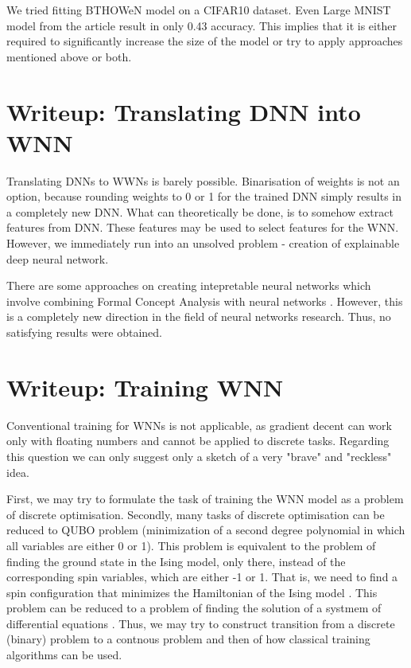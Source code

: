\documentclass{article}[12pt]
\begin{document}
We tried fitting BTHOWeN model on a CIFAR10 dataset. Even Large MNIST model from the article \cite{susskind2022weightless} result in only 0.43 accuracy. This implies that it is either required to significantly increase the size of the model or try to apply approaches mentioned above or both.


\section{Writeup: Translating DNN into WNN}
Translating DNNs to WWNs is barely possible. Binarisation of weights is not an option, because rounding weights to 0 or 1 for the trained DNN simply results in a completely new DNN. What can theoretically be done, is to somehow extract features from DNN. These features may be used to select features for the WNN. However, we immediately run into an unsolved problem - creation of explainable deep neural network.

There are some approaches on creating intepretable neural networks which involve combining Formal Concept Analysis with neural networks \cite{parakal2022intrinsically, dudyrev2022human, kuznetsov2022pattern}. However, this is a completely new direction in the field of neural networks research. Thus, no satisfying results were obtained.

\section{Writeup: Training WNN}
Conventional training for WNNs is not applicable, as gradient decent can work only with floating numbers and cannot be applied to discrete tasks. Regarding this question we can only suggest only a sketch of a very "brave" and "reckless" idea.

First, we may try to formulate the task of training the WNN model as a problem of discrete optimisation. Secondly, many tasks of discrete optimisation can be reduced to QUBO problem (minimization of a second degree polynomial in which all variables are either 0 or 1). This problem is equivalent to the problem of finding the ground state in the Ising model, only there, instead of the corresponding spin variables, which are either -1 or 1. That is, we need to find a spin configuration that minimizes the Hamiltonian of the Ising model \cite{glover2018logical}. This problem can be reduced to a problem of finding the solution of a systmem of differential equations \cite{goto2019combinatorial, goto2021high}. Thus, we may try to construct transition from a discrete (binary) problem to a contnous problem and then of how classical training algorithms can be used.


\newpage


\end{document}
